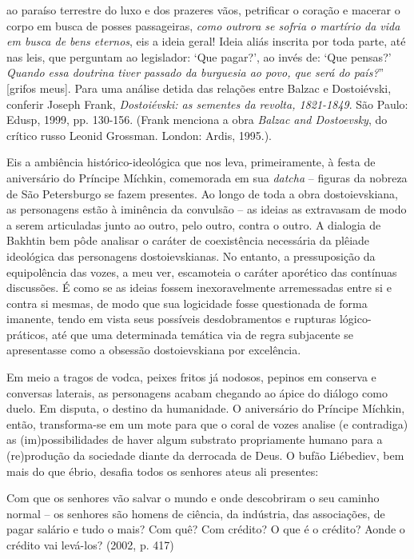 {  ao paraíso terrestre do luxo e dos prazeres vãos, petrificar o coração
  e macerar o corpo em busca de posses passageiras, \emph{como outrora
  se sofria o martírio da vida em busca de bens eternos}, eis a ideia
  geral! Ideia aliás inscrita por toda parte, até nas leis, que
  perguntam ao legislador: `Que pagar?', ao invés de: `Que pensas?'
  \emph{Quando essa doutrina tiver passado da burguesia ao povo, que
  será do país?}'' {[}grifos meus{]}. Para uma análise detida das
  relações entre Balzac e Dostoiévski, conferir Joseph Frank,
  \emph{Dostoiévski: as sementes da revolta, 1821-1849}. São Paulo:
  Edusp, 1999, pp. 130-156. (Frank menciona a obra \emph{Balzac and
  Dostoevsky}, do crítico russo Leonid Grossman. London: Ardis, 1995.)}.

Eis a ambiência histórico-ideológica que nos leva, primeiramente, à
festa de aniversário do Príncipe Míchkin, comemorada em sua
\emph{datcha} -- figuras da nobreza de São Petersburgo se fazem
presentes. Ao longo de toda a obra dostoievskiana, as personagens estão
à iminência da convulsão -- as ideias as extravasam de modo a serem
articuladas junto ao outro, pelo outro, contra o outro. A dialogia de
Bakhtin bem pôde analisar o caráter de coexistência necessária da
plêiade ideológica das personagens dostoievskianas. No entanto, a
pressuposição da equipolência das vozes, a meu ver, escamoteia o caráter
aporético das contínuas discussões. É como se as ideias fossem
inexoravelmente arremessadas entre si e contra si mesmas, de modo que
sua logicidade fosse questionada de forma imanente, tendo em vista seus
possíveis desdobramentos e rupturas lógico-práticos, até que uma
determinada temática via de regra subjacente se apresentasse como a
obsessão dostoievskiana por excelência.

Em meio a tragos de vodca, peixes fritos já nodosos, pepinos em conserva
e conversas laterais, as personagens acabam chegando ao ápice do diálogo
como duelo. Em disputa, o destino da humanidade. O aniversário do
Príncipe Míchkin, então, transforma-se em um mote para que o coral de
vozes analise (e contradiga) as (im)possibilidades de haver algum
substrato propriamente humano para a (re)produção da sociedade diante da
derrocada de Deus. O bufão Liébediev, bem mais do que ébrio, desafia
todos os senhores ateus ali presentes:

Com que os senhores vão salvar o mundo e onde descobriram o seu caminho
normal -- os senhores são homens de ciência, da indústria, das
associações, de pagar salário e tudo o mais? Com quê? Com crédito? O que
é o crédito? Aonde o crédito vai levá-los? (2002, p. 417)

